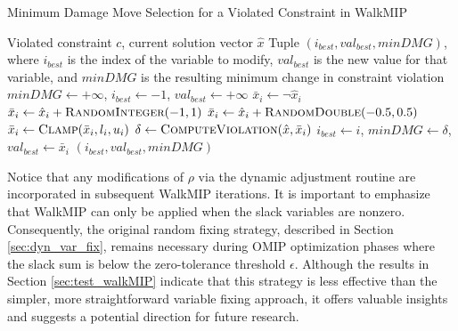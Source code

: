\begin{algorithm}[H]
\caption{Minimum Damage Move Selection for a Violated Constraint in WalkMIP}\label{alg:min_DMG_WalkMIP}
\begin{algorithmic}
\Require Violated constraint $c$, current solution vector $\hat{x}$
\Ensure Tuple $(i_{best}, val_{best}, minDMG)$, where $i_{best}$ is the index of the variable to modify, $val_{best}$ is the new value for that variable, and $minDMG$ is the resulting minimum change in constraint violation
    \State $minDMG \gets +\infty$, $i_{best} \gets -1$, $val_{best} \gets +\infty$
         $\bar{x}_i \gets \neg \hat{x}_i$
         $\bar{x}_i \gets \hat{x}_i + \Call{RandomInteger}{-1,1}$
         $\bar{x}_i \gets \hat{x}_i + \Call{RandomDouble}{-0.5,0.5}$
        \EndIf
        \State $\bar{x}_i \gets \Call{Clamp}{\bar{x}_i,l_i,u_i}$
        \State $\delta \gets \Call{ComputeViolation}{\hat{x},\bar{x}_i}$
            \State $i_{best} \gets i$, $minDMG \gets \delta$, $val_{best} \gets \bar{x}_i$
        \EndIf
    \EndFor
    \State \Return $(i_{best}, val_{best}, minDMG)$
\EndFunction
\end{algorithmic}
\end{algorithm}

Notice that any modifications of $\rho$ via the dynamic adjustment routine are incorporated in subsequent WalkMIP iterations. It is important to emphasize that WalkMIP can only be applied when the slack variables are nonzero. Consequently, the original random fixing strategy, described in Section \ref{sec:dyn_var_fix}, remains necessary during OMIP optimization phases where the slack sum is below the zero-tolerance threshold $\epsilon$.
Although the results in Section \ref{sec:test_walkMIP} indicate that this strategy is less effective than the simpler, more straightforward variable fixing approach, it offers valuable insights and suggests a potential direction for future research.